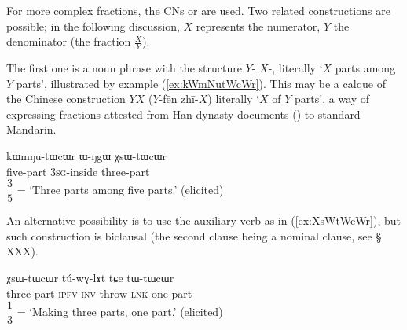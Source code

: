 For more complex fractions, the CNs  or  are used. Two related constructions are possible; in the following discussion, $X$ represents the numerator, $Y$ the denominator (the fraction $\frac{X}{Y}$). 

The first one is a noun phrase with the structure $Y$-  $X$-, literally `$X$ parts among $Y$ parts', illustrated by example (\ref{ex:kWmNutWcWr}). This may be a calque of the Chinese construction $Y$$X$ 
($Y$-fēn zhī-$X$) literally `$X$ of $Y$ parts', a way of expressing fractions attested from Han dynasty documents (\citealt{anicotte15fractions}) to standard Mandarin.
 
\begin{exe}
\ex \label{ex:kWmNutWcWr}
 \gll kɯmŋu-tɯcɯr ɯ-ŋgɯ χsɯ-tɯcɯr  \\
 five-part \textsc{3sg}-inside three-part \\
 \glt $\dfrac{3}{5}$ = `Three parts among five parts.' (elicited)
\end{exe}

An alternative possibility is to use the auxiliary verb  as in (\ref{ex:XsWtWcWr}), but such construction is biclausal (the second clause being a nominal clause, see § XXX).

\begin{exe}
\ex \label{ex:XsWtWcWr}
 \gll χsɯ-tɯcɯr tú-wɣ-lɤt tɕe tɯ-tɯcɯr   \\
 three-part \textsc{ipfv}-\textsc{inv}-throw \textsc{lnk} one-part \\
 \glt $\dfrac{1}{3}$ = `Making three parts, one part.' (elicited)
\end{exe}
